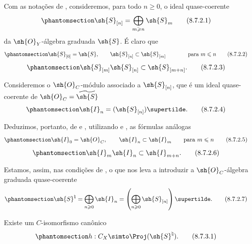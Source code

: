 \documentclass[oneside,10pt]{amsart}
\renewcommand{\leq}{\leqslant}
\renewcommand{\geq}{\geqslant}
\let\EGAOriginalLabel\label
\renewcommand{\label}[1]{\phantomsection\EGAOriginalLabel{#1}}
\begin{document}
\begin{env}[8.7.2]
\label{II.8.7.2}
Com as notações de , consideremos, para todo $n\geq0$, o ideal quase-coerente
\[
\label{II.8.7.2.1}
  \sh{S}_{[n]} = \bigoplus_{m\geq n}\sh{S}_m
\tag{8.7.2.1}
\]
da $\sh{O}_Y$-álgebra graduada $\sh{S}$.
É claro que
\[
\label{II.8.7.2.2}
  \sh{S}_{[0]} = \sh{S},
  \qquad
  \sh{S}_{[n]} \subset \sh{S}_{[m]}
  \qquad\qquad
  \mbox{para $m\leq n$}
\tag{8.7.2.2}
\]
\[
\label{II.8.7.2.3}
  \sh{S}_{[m]} \sh{S}_{[n]} \subset \sh{S}_{[m+n]}.
\tag{8.7.2.3}
\]

Consideremos o $\sh{O}_C$-módulo associado a $\sh{S}_{[n]}$, que é um ideal quase-coerente de $\sh{O}_C = \widetilde{\sh{S}}$ 
\[
\label{II.8.7.2.4}
  \sh{I}_n = (\sh{S}_{[n]})\supertilde.
\tag{8.7.2.4}
\]

Deduzimos, portanto, de  e , utilizando  e , as fórmulas análogas
\[
\label{II.8.7.2.5}
  \sh{I}_{0} = \sh{O}_C,
  \qquad
  \sh{I}_{n} \subset \sh{I}_{m}
  \qquad
  \text{para }m\leq n
\tag{8.7.2.5}
\]
\[
\label{II.8.7.2.6}
  \sh{I}_{m} \sh{I}_{n} \subset \sh{I}_{m+n}.
\tag{8.7.2.6}
\]

Estamos, assim, nas condições de , o que nos leva a introduzir a $\sh{O}_C$-álgebra graduada quase-coerente
\[
\label{II.8.7.2.7}
  \sh{S}^\natural
  =
  \bigoplus_{n\geq0}\sh{I}_n
  =
  \left(
    \bigoplus_{n\geq0} \sh{S}_{[n]}
  \right)\supertilde.
\tag{8.7.2.7}
\]
\end{env}
\begin{proposition}[8.7.3]
\label{II.8.7.3}
Existe um $C$-isomorfismo canônico
\[
\label{II.8.7.3.1}
  h: C_X \simto \Proj(\sh{S}^\natural).
\tag{8.7.3.1}
\]
\end{proposition}
\end{document}
